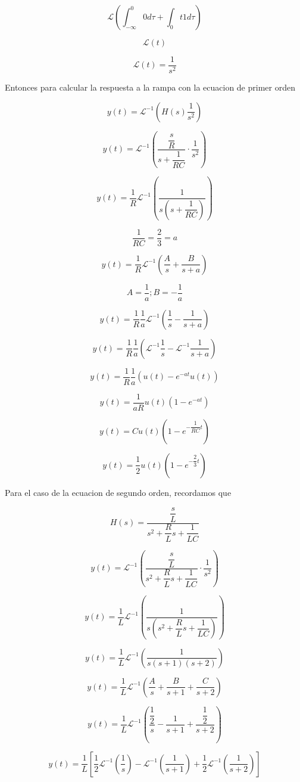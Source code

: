 $$\mathscr{L} (\int_{-\infty}^{0} 0 d\tau + \int_{0}{t} 1 d\tau)$$

$$\mathscr{L} (t)$$

$$\mathscr{L} (t) = \dfrac{1}{s^2}$$

Entonces para calcular la respuesta a la rampa con la ecuacion de primer orden

$$y(t) = \mathscr{L}^{-1} (H(s)\dfrac{1}{s^2})$$

$$y(t) = \mathscr{L}^{-1} (\dfrac{\dfrac{s}{R}}{s + \dfrac{1}{RC}} \cdot \dfrac{1}{s^2})$$

$$y(t) = \dfrac{1}{R} \mathscr{L}^{-1} (\dfrac{1}{s(s + \dfrac{1}{RC})})$$

$$\dfrac{1}{RC} = \dfrac{2}{3} = a$$

$$y(t) = \dfrac{1}{R} \mathscr{L}^{-1} (\dfrac{A}{s} + \dfrac{B}{s + a}) $$

$$A=\dfrac{1}{a}; B=-\dfrac{1}{a} $$

$$y(t) = \dfrac{1}{R} \dfrac{1}{a} \mathscr{L}^{-1}(\dfrac{1}{s} - \dfrac{1}{s+a}) $$

$$y(t) = \dfrac{1}{R} \dfrac{1}{a} (\mathscr{L}^{-1}\dfrac{1}{s} - \mathscr{L}^{-1}\dfrac{1}{s+a})$$

$$y(t) = \dfrac{1}{R} \dfrac{1}{a} (u(t) - e^{-at}u(t))$$

$$y(t) = \dfrac{1}{aR} u(t) (1 - e^{-at})$$

$$y(t) = C u(t) (1 - e^{-\dfrac{1}{RC}t}) $$

$$y(t) = \dfrac{1}{2} u(t) (1 - e^{-\dfrac{2}{3}t}) $$

Para el caso de la ecuacion de segundo orden, recordamos que

$$H(s) = \dfrac{\dfrac{s}{L}}{s^2 + \dfrac{R}{L} s + \dfrac{1}{LC}}$$

$$y(t) = \mathscr{L}^{-1} (\dfrac{\dfrac{s}{L}}{s^2 + \dfrac{R}{L} s + \dfrac{1}{LC}} \cdot \dfrac{1}{s^2})$$

$$y(t) = \dfrac{1}{L} \mathscr{L}^{-1} (\dfrac{1}{s(s^2 + \dfrac{R}{L} s + \dfrac{1}{LC})}) $$

$$y(t) = \dfrac{1}{L} \mathscr{L}^{-1} (\dfrac{1}{s(s+1)(s+2)}) $$

$$y(t) = \dfrac{1}{L} \mathscr{L}^{-1} (\dfrac{A}{s} + \dfrac{B}{s+1} + \dfrac{C}{s+2})$$

$$y(t) = \dfrac{1}{L} \mathscr{L}^{-1} (\dfrac{\dfrac{1}{2}}{s} - \dfrac{1}{s+1} + \dfrac{\dfrac{1}{2}}{s+2}) $$

$$y(t) = \dfrac{1}{L} [\dfrac{1}{2} \mathscr{L}^{-1} (\dfrac{1}{s}) - \mathscr{L}^{-1} (\dfrac{1}{s+1}) + \dfrac{1}{2} \mathscr{L}^{-1} (\dfrac{1}{s+2})] $$

